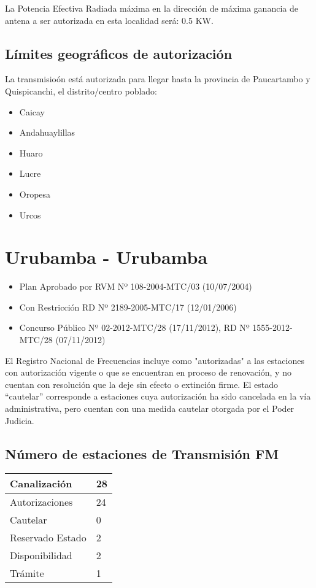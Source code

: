 \documentclass[a4paper]{IEEEtran} %
\begin{document}
La Potencia Efectiva Radiada máxima en la dirección de máxima ganancia de antena a ser autorizada en esta localidad será: 0.5 KW.

\subsection{Límites geográficos de autorización}

La transmisioón está autorizada para llegar hasta la provincia de Paucartambo y Quispicanchi, el distrito/centro poblado:

\begin{itemize}
	\item Caicay
	\item Andahuaylillas
	\item Huaro
	\item Lucre
	\item Oropesa
	\item Urcos
\end{itemize}



\section{Urubamba - Urubamba}

\begin{itemize}
	\item Plan Aprobado por RVM Nº 108-2004-MTC/03 (10/07/2004)
	\item Con Restricción RD Nº 2189-2005-MTC/17 (12/01/2006)
	\item Concurso Público Nº 02-2012-MTC/28 (17/11/2012), RD Nº 1555-2012-MTC/28 (07/11/2012)
\end{itemize}

El Registro Nacional de Frecuencias incluye como "autorizadas" a las estaciones con autorización vigente o que se encuentran en proceso de renovación, y no cuentan con resolución que la deje sin efecto o extinción firme. El estado “cautelar” corresponde a estaciones cuya autorización ha sido cancelada en la vía administrativa, pero cuentan con una medida cautelar otorgada por el Poder Judicia.

\subsection{Número de estaciones de Transmisión FM}

\begin{tabular}{|l|l|} \hline
	Canalización 			& 28 \\ \hline
	Autorizaciones			& 24 \\ \hline
	Cautelar				& 0 \\ \hline
	Reservado Estado		& 2 \\ \hline
	Disponibilidad			& 2 \\ \hline
	Trámite					& 1 \\ \hline 
\end{tabular}
\end{document}
